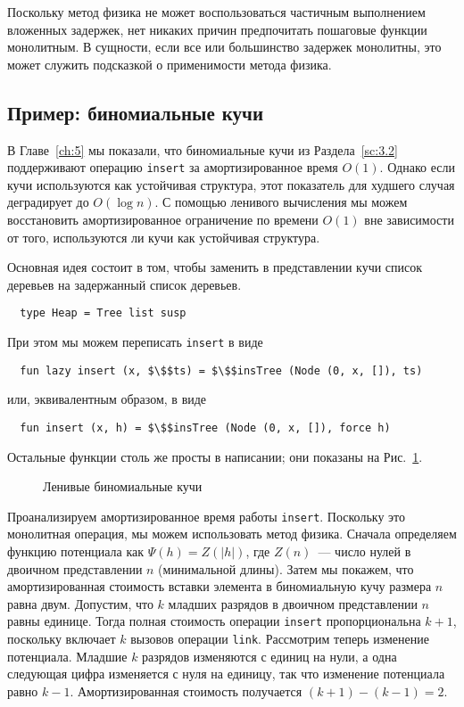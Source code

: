 Поскольку метод физика не может воспользоваться частичным выполнением
вложенных задержек, нет никаких причин предпочитать пошаговые функции
монолитным. В сущности, если все или большинство задержек монолитны,
это может служить подсказкой о применимости метода физика.

\subsection{Пример: биномиальные кучи}
\label{sc:6.4.1}

В Главе~\ref{ch:5} мы показали, что биномиальные кучи из
Раздела~\ref{sc:3.2} поддерживают операцию \lstinline!insert! за
амортизированное время $O(1)$. Однако если кучи используются как
устойчивая структура, этот показатель для худшего случая деградирует
до $O(\log n)$.  С помощью ленивого вычисления мы можем восстановить
амортизированное ограничение по времени $O(1)$ вне зависимости от
того, используются ли кучи как устойчивая структура.

Основная идея состоит в том, чтобы заменить в представлении кучи
список деревьев на задержанный список деревьев.
\begin{lstlisting}
  type Heap = Tree list susp
\end{lstlisting}
При этом мы можем переписать \lstinline!insert! в виде
\begin{lstlisting}
  fun lazy insert (x, $\$$ts) = $\$$insTree (Node (0, x, []), ts)
\end{lstlisting}
или, эквивалентным образом, в виде
\begin{lstlisting}
  fun insert (x, h) = $\$$insTree (Node (0, x, []), force h)
\end{lstlisting}
Остальные функции столь же просты в написании; они показаны на
Рис.~\ref{fig:6.2}.

\begin{figure}
  \centering
  
  \caption{Ленивые биномиальные кучи}
  \label{fig:6.2}
\end{figure}

Проанализируем амортизированное время работы
\lstinline!insert!. Поскольку это монолитная операция, мы можем
использовать метод физика. Сначала определяем функцию потенциала как 
$\Psi(h) = Z(|h|)$, где $Z(n)$~--- число нулей в двоичном
представлении $n$ (минимальной длины). Затем мы покажем, что
амортизированная стоимость вставки элемента в биномиальную кучу
размера $n$ равна двум.  Допустим, что $k$ младших разрядов в двоичном
представлении $n$ равны единице. Тогда полная стоимость операции
\lstinline!insert! пропорциональна $k + 1$, поскольку включает $k$
вызовов операции \lstinline!link!.  Рассмотрим теперь изменение
потенциала. Младшие $k$ разрядов изменяются с единиц на нули, а одна
следующая цифра изменяется с нуля на единицу, так что изменение
потенциала равно $k - 1$. Амортизированная стоимость получается 
$(k + 1)  - (k - 1) = 2$.

